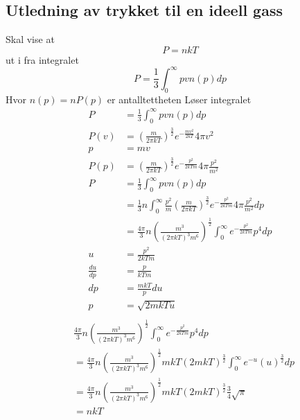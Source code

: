 \documentclass[reprint,english,notitlepage]{revtex4-1}
\begin{document}
	\subsection{Utledning av trykket til en ideell gass}\label{idealGass}
	Skal vise at $$P=nkT$$ ut i fra integralet
	$$
	P=\frac{1}{3}\int_{0}^{\infty}pvn(p)dp
	$$
	Hvor $n(p)=nP(p)$ er antalltettheten
	Løser integralet
	\begin{align*}
	  P&=\frac{1}{3}\int_{0}^{\infty}pvn(p)dp\\
		P(v)&=(\frac{m}{2\pi kT})^{\frac{3}{2}}e^{-\frac{mv^2}{2kT}}4\pi v^2\\
		p&=mv\\
		P(p)&=(\frac{m}{2\pi kT})^{\frac{3}{2}}e^{-\frac{p^2}{2kTm}}4\pi\frac{p^2}{m^2}\\
		P&=\frac{1}{3}\int_{0}^{\infty}pvn(p)dp\\
		&=\frac{1}{3}n\int_{0}^{\infty}\frac{p^2}{m}(\frac{m}{2\pi kT})^{\frac{3}{2}}e^{-\frac{p^2}{2kTm}}4\pi\frac{p^2}{m^2}dp\\
		&=\frac{4\pi}{3}n(\frac{m^3}{(2\pi kT)^3m^6})^{\frac{1}{2}}\int_{0}^{\infty}e^{-\frac{p^2}{2kTm}}p^4dp\\
		u&=\frac{p^2}{2kTm}\\
		\frac{du}{dp}&=\frac{p}{kTm}\\
	  dp&=\frac{mkT}{p}du\\
		p&=\sqrt{2mkTu}\\
  \end{align*}
	\newpage %
	\begin{align*}
		&\frac{4\pi}{3}n(\frac{m^3}{(2\pi kT)^3m^6})^{\frac{1}{2}}\int_{0}^{\infty}e^{-\frac{p^2}{2kTm}}p^4dp\\
		&=\frac{4\pi}{3}n(\frac{m^3}{(2\pi kT)^3m^6})^{\frac{1}{2}}mkT(2mkT)^{\frac{3}{2}}\int_{0}^{\infty}e^{-u}(u)^{\frac{3}{2}}dp\\
		&=\frac{4\pi}{3}n(\frac{m^3}{(2\pi kT)^3m^6})^{\frac{1}{2}}mkT(2mkT)^{\frac{3}{2}}\frac{3}{4}\sqrt{\pi}\\
		&=nkT
	\end{align*}
\end{document}
